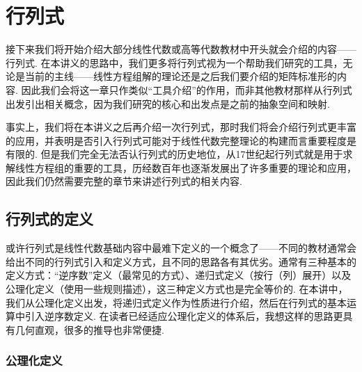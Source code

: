 \chapter{行列式}

接下来我们将开始介绍大部分线性代数或高等代数教材中开头就会介绍的内容——行列式. 在本讲义的思路中，我们更多将行列式视为一个帮助我们研究的工具，无论是当前的主线——线性方程组解的理论还是之后我们要介绍的矩阵标准形的内容. 因此我们会将这一章只作类似``工具介绍''的作用，而非其他教材那样从行列式出发引出相关概念，因为我们研究的核心和出发点是之前的抽象空间和映射.

事实上，我们将在本讲义之后再介绍一次行列式，那时我们将会介绍行列式更丰富的应用，并表明是否引入行列式可能对于线性代数完整理论的构建而言重要程度是有限的. 但是我们完全无法否认行列式的历史地位，从17世纪起行列式就是用于求解线性方程组的重要的工具，历经数百年也逐渐发展出了许多重要的理论和应用，因此我们仍然需要完整的章节来讲述行列式的相关内容.

\section{行列式的定义}

或许行列式是线性代数基础内容中最难下定义的一个概念了——不同的教材通常会给出不同的行列式引入和定义方式，且不同的思路各有其优劣。通常有三种基本的定义方式：``逆序数''定义（最常见的方式）、递归式定义（按行（列）展开）以及公理化定义（使用一些规则描述），这三种定义方式也是完全等价的. 在本讲中，我们从公理化定义出发，将递归式定义作为性质进行介绍，然后在行列式的基本运算中引入逆序数定义. 在读者已经适应公理化定义的体系后，我想这样的思路更具有几何直观，很多的推导也非常便捷.

\subsection{公理化定义}

